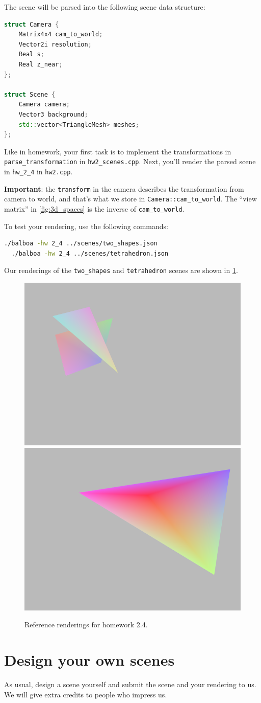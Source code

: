 The scene will be parsed into the following scene data structure:
\begin{lstlisting}[language=C++]
struct Camera {
    Matrix4x4 cam_to_world;
    Vector2i resolution;
    Real s;
    Real z_near;
};

struct Scene {
    Camera camera;
    Vector3 background;
    std::vector<TriangleMesh> meshes;
};
\end{lstlisting}

Like in homework, your first task is to implement the transformations in \lstinline{parse_transformation} in \lstinline{hw2_scenes.cpp}. Next, you'll render the parsed scene in \lstinline{hw_2_4} in \lstinline{hw2.cpp}.

\textbf{Important}: the \lstinline{transform} in the camera describes the transformation from camera to world, and that's what we store in \lstinline{Camera::cam_to_world}. The ``view matrix'' in \cref{fig:3d_spaces} is the inverse of \lstinline{cam_to_world}.

To test your rendering, use the following commands:
\begin{lstlisting}[language=bash]
  ./balboa -hw 2_4 ../scenes/two_shapes.json
  ./balboa -hw 2_4 ../scenes/tetrahedron.json
\end{lstlisting}

Our renderings of the \lstinline{two_shapes} and \lstinline{tetrahedron} scenes are shown in \cref{fig:hw2_4}.
\begin{figure}[h]
    \centering
    \includegraphics[width=0.49\linewidth]{imgs/hw_2_4_two_shapes.png}
    \includegraphics[width=0.49\linewidth]{imgs/hw_2_4_tetrahedron.png}
    \caption{Reference renderings for homework 2.4.}
    \label{fig:hw2_4}
\end{figure}

\section{Design your own scenes}

As usual, design a scene yourself and submit the scene and your rendering to us. We will give extra credits to people who impress us.


%
%


